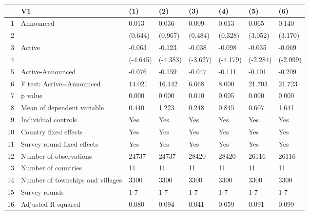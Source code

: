 \begin{table}[ht]
\centering
\begin{tabular}{rlllllll}
  \hline
 & V1 & (1) & (2) & (3) & (4) & (5) & (6) \\ 
  \hline
1 & Announced & 0.013 & 0.036 & 0.009 & 0.013 & 0.065 & 0.140 \\ 
  2 &  & (0.644) & (0.967) & (0.484) & (0.328) & (3.052) & (3.170) \\ 
  3 & Active & -0.063 & -0.123 & -0.038 & -0.098 & -0.035 & -0.069 \\ 
  4 &  & (-4.645) & (-4.383) & (-3.627) & (-4.179) & (-2.284) & (-2.099) \\ 
  5 & Active-Announced & -0.076 & -0.159 & -0.047 & -0.111 & -0.101 & -0.209 \\ 
  6 & F test: Active=Announced & 14.021 & 16.442 & 6.668 & 8.000 & 21.703 & 21.723 \\ 
  7 & p value & 0.000 & 0.000 & 0.010 & 0.005 & 0.000 & 0.000 \\ 
  8 & Mean of dependent variable & 0.440 & 1.223 & 0.248 & 0.845 & 0.607 & 1.641 \\ 
  9 & Individual controls & Yes & Yes & Yes & Yes & Yes & Yes \\ 
  10 & Country fixed effects & Yes & Yes & Yes & Yes & Yes & Yes \\ 
  11 & Survey round fixed effects & Yes & Yes & Yes & Yes & Yes & Yes \\ 
  12 & Number of observations & 24737 & 24737 & 28420 & 28420 & 26116 & 26116 \\ 
  13 & Number of countries & 11 & 11 & 11 & 11 & 11 & 11 \\ 
  14 & Number of townships and villages & 3300 & 3300 & 3300 & 3300 & 3300 & 3300 \\ 
  15 & Survey rounds & 1-7 & 1-7 & 1-7 & 1-7 & 1-7 & 1-7 \\ 
  16 & Adjusted R squared & 0.080 & 0.094 & 0.041 & 0.059 & 0.091 & 0.099 \\ 
   \hline
\end{tabular}
\end{table}
